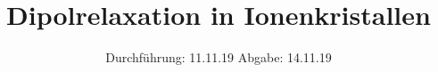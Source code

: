

\subject{V48}
\title{Dipolrelaxation in Ionenkristallen}
\date{
  Durchführung: 11.11.19
  \hspace{3em}
  Abgabe: 14.11.19
}



\maketitle
\thispagestyle{empty}
\tableofcontents
\newpage




%



\newpage
\printbibliography


